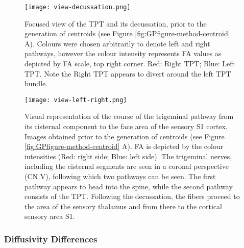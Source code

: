 \begin{figure}[ht]
\centering
\texttt{[image: view-decussation.png]}
\caption{Focused view of the TPT and its decussation, prior to the generation of centroids (see Figure \ref{fig:GPfigure-method-centroid} A). Colours were chosen arbitrarily to denote left and right pathways, however the colour intensity represents FA values as depicted by FA scale, top right corner. Red: Right TPT; Blue: Left TPT. Note the Right TPT appears to divert around the left TPT bundle. }
\label{fig:GPfigure2}
\end{figure}

\begin{figure}[ht]
\centering
\texttt{[image: view-left-right.png]}
\caption{Visual representation of the course of the trigeminal pathway from its cisternal component to the face area of the sensory S1 cortex. Images obtained prior to the generation of centroids (see Figure \ref{fig:GPfigure-method-centroid} A). FA is depicted by the colour intensities (Red: right side; Blue: left side). The trigeminal nerves, including the cisternal segments are seen in a coronal perspective (CN V), following which two pathways can be seen. The first pathway appears to head into the spine, while the second pathway consists of the TPT. Following the decussation, the fibers proceed to the area of the sensory thalamus and from there to the cortical sensory area S1.}
\label{fig:GPfigure3}
\end{figure}

\subsubsection{Diffusivity Differences}
